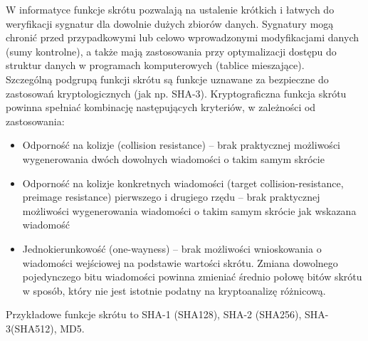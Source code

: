 \documentclass[a4paper,12pt,oneside]{book}
\begin{document}
W informatyce funkcje skrótu pozwalają na ustalenie krótkich i łatwych do weryfikacji sygnatur dla dowolnie dużych zbiorów danych. Sygnatury mogą chronić przed przypadkowymi lub celowo wprowadzonymi modyfikacjami danych (sumy kontrolne), a także mają zastosowania przy optymalizacji dostępu do struktur danych w programach komputerowych (tablice mieszające).\\

Szczególną podgrupą funkcji skrótu są funkcje uznawane za bezpieczne do zastosowań kryptologicznych (jak np. SHA-3). Kryptograficzna funkcja skrótu powinna spełniać kombinację następujących kryteriów, w zależności od zastosowania:\\
\begin{itemize}
	\item Odporność na kolizje (collision resistance) – brak praktycznej możliwości wygenerowania dwóch dowolnych wiadomości o takim samym skrócie
	\item Odporność na kolizje konkretnych wiadomości (target collision-resistance, preimage resistance) pierwszego i drugiego rzędu – brak praktycznej możliwości wygenerowania wiadomości o takim samym skrócie jak wskazana wiadomość
	\item Jednokierunkowość (one-wayness) – brak możliwości wnioskowania o wiadomości wejściowej na podstawie wartości skrótu. Zmiana dowolnego pojedynczego bitu wiadomości powinna zmieniać średnio połowę bitów skrótu w sposób, który nie jest istotnie podatny na kryptoanalizę różnicową.
\end{itemize}

Przykładowe funkcje skrótu to SHA-1 (SHA128), SHA-2 (SHA256), SHA-3(SHA512), MD5.

\setcounter{subsection}{32}
\end{document}
